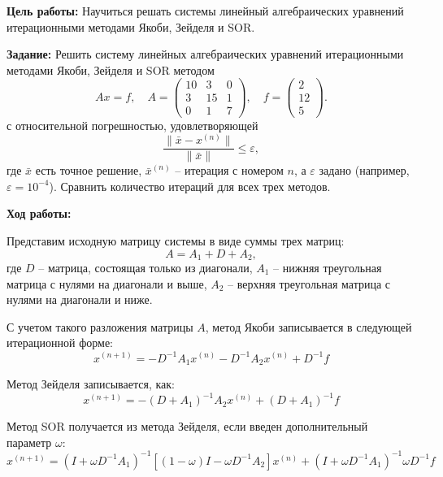 \justifying
\textbf{Цель работы:}
Научиться решать системы линейный алгебраических уравнений итерационными методами Якоби, Зейделя и SOR.

\textbf{Задание:}
Решить систему линейных алгебраических уравнений итерационными методами Якоби, Зейделя и SOR методом
\begin{equation}\label{task}
    Ax = f,\quad A = 
    \begin{pmatrix}
    10 & 3 & 0 \\
    3 & 15 & 1 \\
    0 & 1 & 7
    \end{pmatrix}, \quad
    f = 
    \begin{pmatrix}
    2 \\
    12 \\
    5
    \end{pmatrix}.
\end{equation}
с относительной погрешностью, удовлетворяющей
\begin{equation}
    \frac{\|\bar{x} - x^{(n)} \|}{\| \bar{x} \|} \leq \varepsilon,
\end{equation}
где $\bar{x}$ есть точное решение, $\bar{x}^{(n)}$ -- итерация с номером $n$, а $\varepsilon$ задано (например, $\varepsilon = 10^{-4}$). Сравнить количество итераций для всех трех методов.

\textbf{Ход работы:}

Представим исходную матрицу системы в виде суммы трех матриц:
\begin{equation}
    A = A_1 + D + A_2,
\end{equation}
где $D$ -- матрица, состоящая только из диагонали, $A_1$ -- нижняя треугольная матрица с нулями на диагонали и выше, $A_2$ -- верхняя треугольная матрица с нулями на диагонали и ниже.

С учетом такого разложения матрицы $A$, метод Якоби записывается в следующей итерационной форме:
\begin{equation}
    x^{(n+1)} = -D^{-1}A_1x^{(n)} -D^{-1}A_2x^{(n)} + D^{-1}f
\end{equation}

Метод Зейделя записывается, как:
\begin{equation}
    x^{(n+1)} = -(D + A_1)^{-1}A_2x^{(n)} + (D + A_1)^{-1}f
\end{equation}

Метод SOR получается из метода Зейделя, если введен дополнительный параметр $\omega$:
\begin{equation}
    x^{(n+1)} = (I + \omega D^{-1}A_1)^{-1}[(1 - \omega)I - \omega D^{-1}A_2]x^{(n)} + (I + \omega D^{-1}A_1)^{-1}\omega D^{-1}f
\end{equation}

